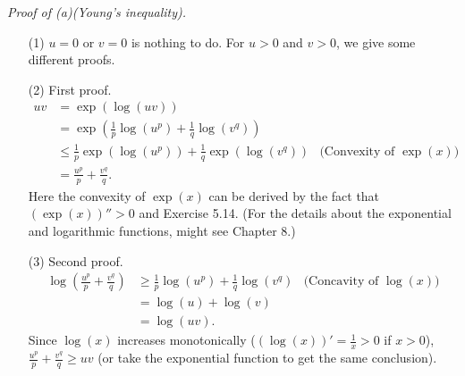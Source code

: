 \documentclass{article}
\begin{document}
\emph{Proof of (a)(Young's inequality).}
\begin{enumerate}
  \item[(1)]
  $u = 0$ or $v = 0$ is nothing to do.
  For $u > 0$ and $v > 0$, we give some different proofs.

  \item[(2)]
  First proof.
  \begin{align*}
    uv
    &= \exp(\log(uv)) \\
    &= \exp(\frac{1}{p}\log(u^p) + \frac{1}{q}\log(v^q)) \\
    &\leq \frac{1}{p} \exp(\log(u^p)) + \frac{1}{q}\exp(\log(v^q))
      &\text{(Convexity of $\exp(x)$)} \\
    &= \frac{u^p}{p} + \frac{v^q}{q}.
  \end{align*}
  Here the convexity of $\exp(x)$ can be derived
  by the fact that $(\exp(x))'' > 0$ and Exercise 5.14.
  (For the details about the exponential and logarithmic functions,
  might see Chapter 8.)

  \item[(3)]
  Second proof.
  \begin{align*}
    \log(\frac{u^p}{p} + \frac{v^q}{q})
    &\geq \frac{1}{p} \log(u^p) + \frac{1}{q}\log(v^q)
      &\text{(Concavity of $\log(x)$)} \\
    &= \log(u) + \log(v) \\
    &= \log(uv).
  \end{align*}
  Since $\log(x)$ increases monotonically ($(\log(x))' = \frac{1}{x} > 0$ if $x > 0$),
  $\frac{u^p}{p} + \frac{v^q}{q} \geq uv$
  (or take the exponential function to get the same conclusion).


\end{enumerate}
\end{document}
